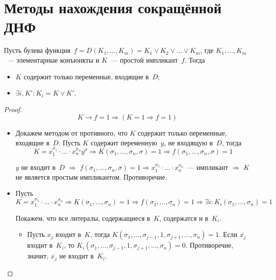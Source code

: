 \section{Методы нахождения сокращённой ДНФ}
\begin{statement}
\label{st:about_prime_implicants_1}
Пусть булева функция~$f = D(K_1, \ldots, K_m) = K_1 \lor K_2 \lor \ldots \lor K_m$, где $K_1, \ldots, K_m$~--- элементарные конъюнкты и $K$~--- простой импликант~$f$.
Тогда
\begin{itemize}
	\item $K$ содержит только переменные, входящие в~$D$;
	\item $\exists i, K' \colon K_i = K \lor K'$.
\end{itemize}
\end{statement}
\begin{proof}
\begin{equation*}
K \rightarrow f = 1 \Rightarrow (K = 1 \Rightarrow f = 1)
\end{equation*}
\begin{itemize}
	\item Докажем методом от противного, что $K$ содержит только переменные, входящие в~$D$.
	Пусть $K$ содержит переменную~$y$, не входящую в~$D$, тогда
	\begin{equation*}
	K = x_1^{\sigma_1} \cdot \ldots \cdot x_n^{\sigma_n} y^\sigma \Rightarrow
	K(\sigma_1, \ldots, \sigma_n, \sigma) = 1 \Rightarrow
	f(\sigma_1, \ldots, \sigma_n, \sigma) = 1
	\end{equation*}
	
	$y$ не входит в~$D$ $\Rightarrow$ $f(\sigma_1, \ldots, \sigma_n, \overline\sigma) = 1 \Rightarrow x_1^{\sigma_1} \cdot \ldots \cdot x_n^{\sigma_n}$~--- импликант $\Rightarrow$ $K$ не является простым импликантом.
	Противоречие.
	
	\item Пусть
	\begin{equation*}
	K = x_1^{\sigma_1} \cdot \ldots \cdot x_n^{\sigma_n} \Rightarrow
	K(\sigma_1, \ldots, \sigma_n) = 1 \Rightarrow
	f(\sigma_1, \ldots, \sigma_n) = 1 \Rightarrow
	\exists i \colon K_i(\sigma_1, \ldots, \sigma_n) = 1
	\end{equation*}
	
	Покажем, что все литералы, содержащиеся в~$K$, содержатся и в~$K_i$.
	\begin{itemize}
		\item Пусть $x_j$ входит в~$K$, тогда $K(\sigma_1, \ldots, \sigma_{j-1}, 1, \sigma_{j+1}, \ldots, \sigma_n) = 1$.
		Если $\overline{x_j}$ входит в~$K_i$, то $K_i(\sigma_1, \ldots, \sigma_{j-1}, 1, \sigma_{j+1}, \ldots, \sigma_n) = 0$.
		Противоречие, значит, $\overline{x_j}$ не входит в~$K_i$.
		

\end{itemize}
\end{itemize}
\end{proof}
